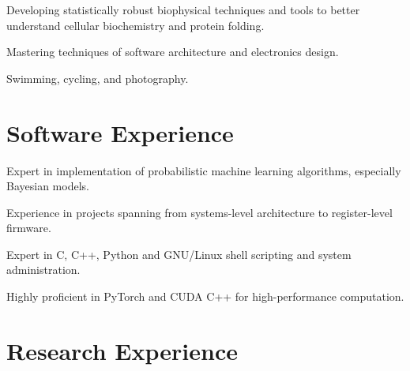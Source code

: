 \documentclass[letterpaper]{article}
\renewenvironment{itemize}{
  \begin{list}{}{
    \setlength{\leftmargin}{1.5em}
  }
}{
  \end{list}
}
\begin{document}
\begin{itemize}
\item{
  Developing statistically robust biophysical techniques and tools to better
  understand cellular biochemistry and protein folding.
}
\item{
  Mastering techniques of software architecture and electronics design.
}
\item{
  Swimming, cycling, and photography.
}
\end{itemize}


\section*{Software Experience}

\begin{itemize}
\item{
  Expert in implementation of probabilistic machine learning algorithms,
  especially Bayesian models.
}
\item{
  Experience in projects spanning from systems-level architecture to
  register-level firmware.
}
\item{
  Expert in C, C++, Python and GNU/Linux shell scripting and
  system administration.
}
\item{
  Highly proficient in PyTorch and CUDA C++ for high-performance
  computation.
}
\end{itemize}


\section*{Research Experience}
\end{document}
